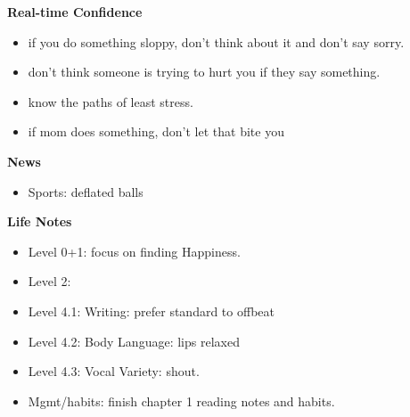 \documentclass[11pt]{article}
\begin{document}
{            %
            \textbf{Real-time Confidence}\\
            \begin{itemize}
              \tiny \item \tiny if you do something sloppy, don't think about it and don't say sorry.
            \item \tiny don't think someone is trying to hurt you if they say something.
            \item \tiny know the paths of least stress.
            \item \tiny if mom does something, don't let that bite you
            \end{itemize}

            \textbf{News} 
            \begin{itemize}
            \item \tiny Sports: deflated balls 
            \end{itemize} 
    
            \textbf{Life Notes}
            \begin{itemize}
              \tiny \item \tiny Level 0+1: focus on finding Happiness.
            \item \tiny Level 2:
            \item \tiny Level 4.1: Writing: prefer standard to offbeat
            \item \tiny Level 4.2: Body Language: lips relaxed
            \item \tiny Level 4.3: Vocal Variety: shout.
            \item \tiny Mgmt/habits: finish chapter 1 reading notes and habits.
            \end{itemize} 
            \newpage

}
\end{document}
